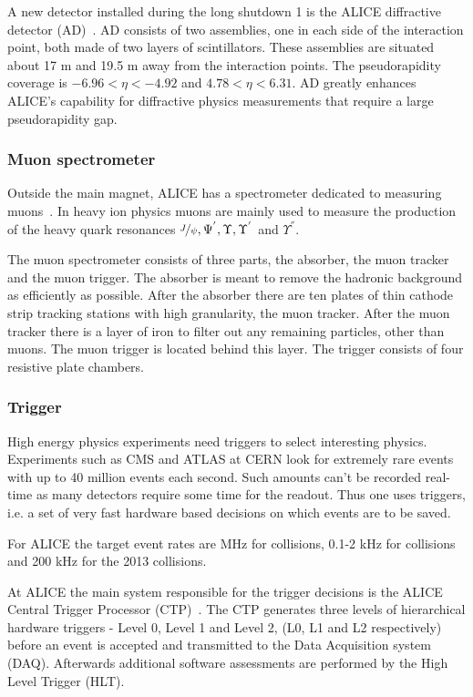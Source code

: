 A new detector installed during the long shutdown 1 is the ALICE diffractive detector (AD)~\cite{AD}. AD consists of two assemblies, one in each side of the interaction point, both made of two layers of scintillators. These assemblies are situated about 17 m and 19.5 m away from the interaction points. The pseudorapidity coverage is $-6.96 < \eta < -4.92 $ and $4.78 < \eta < 6.31$. AD greatly enhances ALICE's capability for diffractive physics measurements that require a large pseudorapidity gap.

\subsubsection{Muon spectrometer}
Outside the main magnet, ALICE has a spectrometer dedicated to measuring muons~\cite{MuonSpectro}. In heavy ion physics muons are mainly used to measure the production of the heavy quark resonances $\nicefrac{J}{\psi}, \Psi^{'}, \Upsilon, \Upsilon^{'}$ and $\Upsilon^{''}$.

The muon spectrometer consists of three parts, the absorber, the muon tracker and the muon trigger. The absorber is meant to remove the hadronic background as efficiently as possible. After the absorber there are ten plates of thin cathode strip tracking stations with high granularity, the muon tracker. After the muon tracker there is a layer of iron to filter out any remaining particles, other than muons. The muon trigger is located behind this layer. The trigger consists of four resistive plate chambers. 
\subsubsection{Trigger}
High energy physics experiments need triggers to select interesting physics. Experiments such as CMS and ATLAS at CERN look for extremely rare events with up to 40 million events each second. Such amounts can't be recorded real-time as many detectors require some time for the readout. Thus one uses triggers, i.e. a set of very fast hardware based decisions on which events are to be saved.

For ALICE the target event rates are \unit[1]{MHz} for \pp collisions, 0.1-2 \unit{kHz} for \PbPb collisions and 200 \unit{kHz} for the 2013 \pPb collisions.

At ALICE the main system responsible for the trigger decisions is the ALICE Central Trigger Processor (CTP)~\cite{ctp}. The CTP generates three levels of hierarchical hardware triggers - Level 0, Level 1 and Level 2, (L0, L1 and L2 respectively) before an event is accepted and transmitted to the Data Acquisition system (DAQ). Afterwards additional software assessments are performed by the High Level Trigger (HLT).
